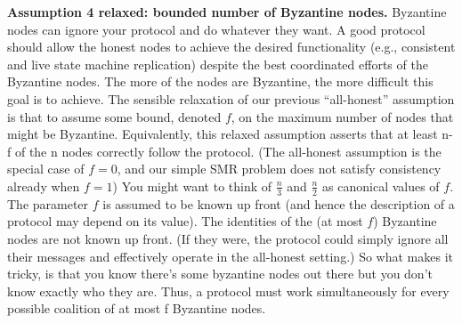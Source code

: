 \noindent
\textbf{Assumption 4 relaxed: bounded number of Byzantine nodes.} Byzantine nodes
can ignore your protocol and do whatever they want. A good protocol should allow the
honest nodes to achieve the desired functionality (e.g., consistent and live state machine
replication) despite the best coordinated efforts of the Byzantine nodes. The more of the
nodes are Byzantine, the more difficult this goal is to achieve. The sensible relaxation of our
previous “all-honest” assumption is that to assume some bound, denoted $f$, on the maximum
number of nodes that might be Byzantine. Equivalently, this relaxed assumption asserts that
at least n-f of the n nodes correctly follow the protocol. (The all-honest assumption is the
special case of $f = 0$, and our simple SMR problem does not satisfy consistency already when
$f = 1$) You might want to think of $\frac{n}{3}$ and $\frac{n}{2}$ as canonical values of $f$. The parameter $f$
is assumed to be known up front (and hence the description of a protocol may depend on
its value). The identities of the (at most $f$) Byzantine nodes are not known up front. (If they were, the protocol could simply ignore all their messages and effectively operate in the all-honest setting.) So what makes it tricky, is that you know there's some byzantine nodes out there but you don't
know exactly who they are.  Thus, a protocol must work simultaneously for every possible coalition
of at most f Byzantine nodes.



